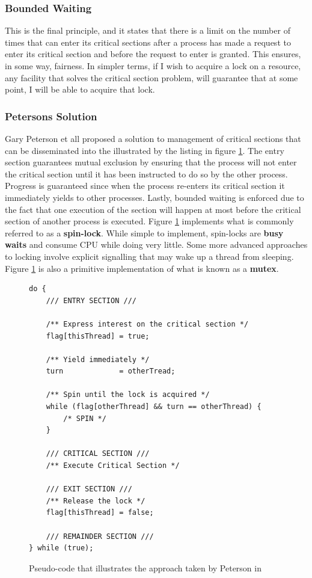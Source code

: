 \documentclass[10pt,a4paper]{article}
\begin{document}
\subsubsection{Bounded Waiting}
This is the final principle, and it states that there is a limit on the number of times that can enter its critical sections after a process has made a request to enter its critical section and before the request to enter is granted. This ensures, in some way, fairness. In simpler terms, if I wish to acquire a lock on a resource, any facility that solves the critical section problem, will guarantee that at some point, I will be able to acquire that lock. 
\subsubsection{Petersons Solution}
Gary Peterson et all \cite{Peterson} proposed a solution to management of critical sections that can be disseminated into the  illustrated by the listing in figure \ref{plisting}. The entry section guarantees mutual exclusion by ensuring that the process will not enter the critical section until it has been instructed to do so by the other process. Progress is guaranteed since when the process re-enters its critical section it immediately yields to other processes. Lastly, bounded waiting is enforced due to the fact that one execution of the section will happen at most before the critical section of another process is executed. Figure \ref{plisting} implements what is commonly referred to as a {\bf spin-lock}. While simple to implement, spin-locks are {\bf busy waits} and consume CPU while doing very little. Some more advanced approaches to locking involve explicit signalling that may wake up a thread from sleeping. Figure \ref{plisting} is also a primitive implementation of what is known as a {\bf mutex}.
\begin{figure}
\caption{Pseudo-code that illustrates the approach taken by Peterson in \cite{Peterson}}
\begin{center}
\begin{lstlisting}
do {
	/// ENTRY SECTION ///

	/** Express interest on the critical section */
	flag[thisThread] = true;
	
	/** Yield immediately */
	turn 			 = otherTread;
	
	/** Spin until the lock is acquired */
	while (flag[otherThread] && turn == otherThread) {
		/* SPIN */
	}
	
	/// CRITICAL SECTION ///
	/** Execute Critical Section */
	
	/// EXIT SECTION ///
	/** Release the lock */
	flag[thisThread] = false;
	
	/// REMAINDER SECTION ///
} while (true);
\end{lstlisting}
\label{plisting}
\end{center}
\end{figure}
\end{document}
